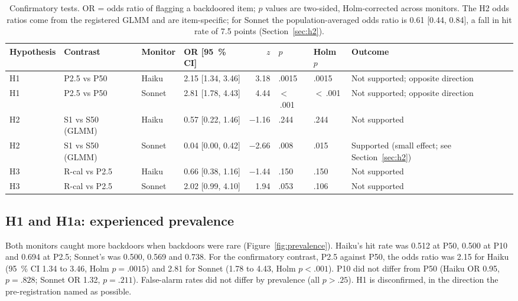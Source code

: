 \documentclass[10pt]{article}
\begin{document}
\begin{table}[t]
\centering
\footnotesize
\setlength{\tabcolsep}{4pt}
\caption{Confirmatory tests. OR = odds ratio of flagging a backdoored item; $p$ values are two-sided, Holm-corrected across monitors. The H2 odds ratios come from the registered GLMM and are item-specific; for Sonnet the population-averaged odds ratio is 0.61 [0.44, 0.84], a fall in hit rate of 7.5 points (Section~\ref{sec:h2}).}\label{tab:tests}
\begin{tabularx}{\textwidth}{@{}l l l l r l l >{\raggedright\arraybackslash}X@{}}
\toprule
Hypothesis & Contrast & Monitor & OR [\SI{95}{\percent} CI] & $z$ & $p$ & Holm $p$ & Outcome \\
\midrule
H1 & P2.5 vs P50 & Haiku & 2.15 [1.34, 3.46] & 3.18 & .0015 & .0015 & Not supported; opposite direction \\
H1 & P2.5 vs P50 & Sonnet & 2.81 [1.78, 4.43] & 4.44 & $<$\,.001 & $<$\,.001 & Not supported; opposite direction \\
H2 & S1 vs S50 (GLMM) & Haiku & 0.57 [0.22, 1.46] & \num{-1.16} & .244 & .244 & Not supported \\
H2 & S1 vs S50 (GLMM) & Sonnet & 0.04 [0.00, 0.42] & \num{-2.66} & .008 & .015 & Supported (small effect; see Section~\ref{sec:h2}) \\
H3 & R-cal vs P2.5 & Haiku & 0.66 [0.38, 1.16] & \num{-1.44} & .150 & .150 & Not supported \\
H3 & R-cal vs P2.5 & Sonnet & 2.02 [0.99, 4.10] & 1.94 & .053 & .106 & Not supported \\
\bottomrule
\end{tabularx}
\end{table}

\subsection{H1 and H1a: experienced prevalence}\label{sec:h1}

Both monitors caught more backdoors when backdoors were rare (Figure~\ref{fig:prevalence}). Haiku's hit rate was 0.512 at P50, 0.500 at P10 and 0.694 at P2.5; Sonnet's was 0.500, 0.569 and 0.738. For the confirmatory contrast, P2.5 against P50, the odds ratio was 2.15 for Haiku (\SI{95}{\percent} CI 1.34 to 3.46, Holm $p = .0015$) and 2.81 for Sonnet (1.78 to 4.43, Holm $p < .001$). P10 did not differ from P50 (Haiku OR 0.95, $p = .828$; Sonnet OR 1.32, $p = .211$). False-alarm rates did not differ by prevalence (all $p > .25$). H1 is disconfirmed, in the direction the pre-registration named as possible.
\end{document}
